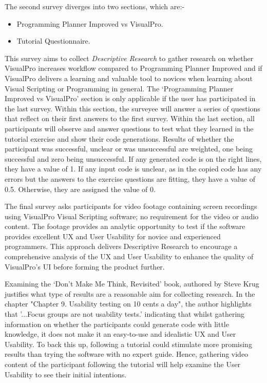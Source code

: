 \documentclass[12pt]{report} %
\begin{document}
	The second survey diverges into two sections, which are:-
	\begin{itemize}
		\item Programming Planner Improved vs VisualPro.
		\item Tutorial Questionnaire.
	\end{itemize}
	
	This survey aims to collect \textit{Descriptive Research} to gather research on whether VisualPro increases workflow compared to Programming Planner Improved and if VisualPro delivers a learning and valuable tool to novices when learning about Visual Scripting or Programming in general. The `Programming Planner Improved vs VisualPro' section is only applicable if the user has participated in the last survey. Within this section, the surveyee will answer a series of questions that reflect on their first answers to the first survey. Within the last section, all participants will observe and answer questions to test what they learned in the tutorial exercise and show their code generations. Results of whether the participant was successful, unclear or was unsuccessful are weighted, one being successful and zero being unsuccessful. If any generated code is on the right lines, they have a value of 1. If any input code is unclear, as in the copied code has any errors but the answers to the exercise questions are fitting, they have a value of 0.5. Otherwise, they are assigned the value of 0.

	The final survey asks participants for video footage containing screen recordings using VisualPro Visual Scripting software; no requirement for the video or audio content. The footage provides an analytic opportunity to test if the software provides excellent UX and User Usability for novice and experienced programmers. This approach delivers Descriptive Research to encourage a comprehensive analysis of the UX and User Usability to enhance the quality of VisualPro's UI before forming the product further.

	Examining the `Don't Make Me Think, Revisited' book, authored by Steve Krug~\cite{krug_steve_dont_2014} justifies what type of results are a reasonable aim for collecting research. In the chapter "Chapter 9. Usability testing on 10 cents a day", the author highlights that '...Focus groups are not usability tests.' indicating that whilst gathering information on whether the participants could generate code with little knowledge, it does not make it an easy-to-use and idealistic UX and User Usability. To back this up, following a tutorial could stimulate more promising results than trying the software with no expert guide. Hence, gathering video content of the participant following the tutorial will help examine the User Usability to see their initial intentions.
	
\end{document}
